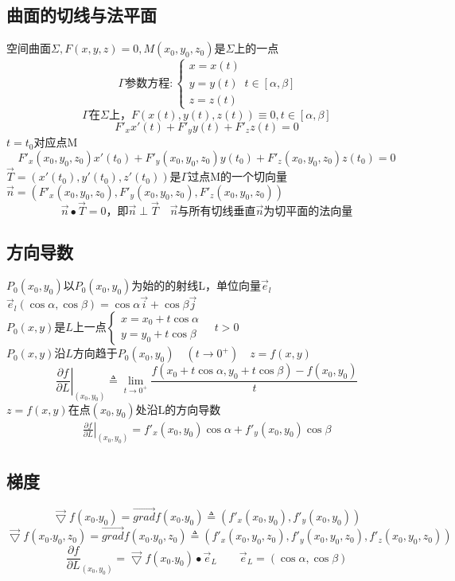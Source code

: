 \subsection{曲面的切线与法平面}
空间曲面$\Sigma,F(x,y,z)=0,M(x_0,y_0,z_0)$是$\Sigma$上的一点\\
$$\Gamma\mbox{参数方程}:\begin{cases}
	x=x(t)\\
	y=y(t)\\
	z=z(t)
\end{cases}t\in[\alpha,\beta]$$
$$\Gamma\mbox{在}\Sigma\mbox{上}，F(x(t),y(t),z(t))\equiv 0,t\in[\alpha,\beta]$$
$$F'_xx'(t)+F'_yy(t)+F'_zz(t)=0$$
$t=t_0$\mbox{对应点}M
$$F'_x(x_0,y_0,z_0)x'(t_0)+F'_y(x_0,y_0,z_0)y(t_0)+F'_z(x_0,y_0,z_0)z(t_0)=0$$
$\overrightarrow{T}=(x'(t_0),y'(t_0),z'(t_0))$是$\Gamma$过点M的一个切向量\\
$\overrightarrow{n}=(F'_x(x_0,y_0,z_0),F'_y(x_0,y_0,z_0),F'_z(x_0,y_0,z_0))$
$$\overrightarrow{n}\bullet\overrightarrow{T}=0\mbox{，即}\overrightarrow{n}\perp\overrightarrow{T}\quad\overrightarrow{n}\mbox{与所有切线垂直}\overrightarrow{n}\mbox{为切平面的法向量}$$
\subsection{方向导数}
$P_0(x_0,y_0)$以$P_0(x_0,y_0)$为始的的射线L，单位向量$\overrightarrow{e}_l$\\
$\overrightarrow{e}_l(\cos\alpha,\cos\beta)=\cos\alpha\overrightarrow{i}+\cos\beta\overrightarrow{j}$\\
$P_0(x,y)$是$L$上一点$\begin{cases}
	x=x_0+t\cos\alpha\\
	y=y_0+t\cos\beta
\end{cases}\quad t>0$\\
$P_0(x,y)$沿$L$方向趋于$P_0(x_0,y_0)\quad(t\to 0^+)\quad z=f(x,y)$\\
$$\left.\frac{\partial f}{\partial L}\right|_{(x_0,y_0)}\triangleq\lim\limits_{t\to 0^+}\frac{f(x_0+t\cos\alpha,y_0+t\cos\beta)-f(x_0,y_0)}{t}$$
$z=f(x,y)$在点$(x_0,y_0)$处沿L的方向导数
\begin{align}
	\left.\frac{\partial f}{\partial L}\right|_{(x_0,y_0)}=f'_x(x_0,y_0)\cos\alpha+f'_y(x_0,y_0)\cos\beta\label{Directional_derivative}
\end{align}
\subsection{梯度}
$$\overrightarrow{\bigtriangledown} f(x_0.y_0)=\overrightarrow{grad}f(x_0.y_0)\triangleq\left(f'_x(x_0,y_0),f'_y(x_0,y_0)\right)$$
$$\overrightarrow{\bigtriangledown} f(x_0.y_0,z_0)=\overrightarrow{grad}f(x_0.y_0,z_0)\triangleq\left(f'_x(x_0,y_0,z_0),f'_y(x_0,y_0,z_0),f'_z(x_0,y_0,z_0)\right)$$
$$\frac{\partial f}{\partial L}_{(x_0,y_0)}=\overrightarrow{\bigtriangledown} f(x_0.y_0)\bullet\overrightarrow{e}_L\qquad\overrightarrow{e}_L=(\cos\alpha,\cos\beta)$$
